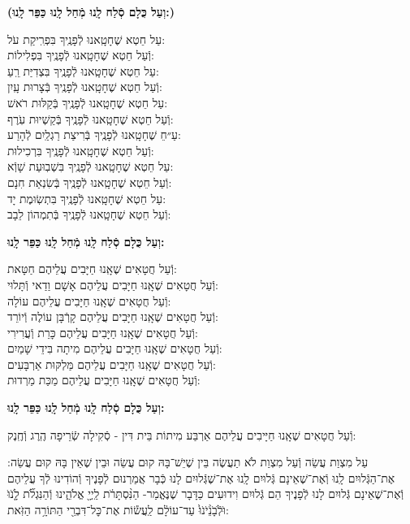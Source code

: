 \documentclass[twoside, openany, parskip=half, 11pt]{book}
\begin{document}
\textbf{(וְעַל כֻּלָם סְֿלַח לָֽנוּ מְֿחַל לָֽנוּ כַּפֵּר לָֽנוּ:)}

עַל חֵטְא שֶׁחָטָֽאנוּ לְֿפָנֶֽיךָ בִּפְרִֽיקַת עֹל:\\ וְֿעַל חֵטְא שֶׁחָטָֽאנוּ לְֿפָנֶֽיךָ בִּפְלִילוֹת: \\
עַל חֵטְא שֶׁחָטָֽאנוּ לְֿפָנֶֽיךָ בִּצְדִיַּת רֵֽעַ: \\ וְֿעַל חֵטְא שֶׁחָטָֽאנוּ לְֿפָנֶֽיךָ בְּֿצָרוּת עָֽיִן: \\
עַל חֵטְא שֶׁחָטָֽאנוּ לְֿפָנֶֽיךָ בְּֿקַלּוּת רֹאשׁ:\\ וְֿעַל חֵטְא שֶׁחָטָֽאנוּ לְֿפָנֶֽיךָ בְּֿקַשְׁיוּת עֹֽרֶף: \\
עַ״חֵ שֶׁחָטָֽאנוּ לְֿפָנֶֽיךָ בְּֿרִיצַת רַגְלַֽיִם לְֿהָרַע:\\ וְֿעַל חֵטְא שֶׁחָטָֽאנוּ לְֿפָנֶֽיךָ בִּרְכִילוּת: \\
עַל חֵטְא שֶׁחָטָֽאנוּ לְֿפָנֶֽיךָ בִּשְׁבֽוּעַת שָׁוְֿא: \\ וְֿעַל חֵטְא שֶׁחָטָֽאנוּ לְֿפָנֶֽיךָ בְּֿשִׂנְאַת חִנָם: \\
עַל חֵטְא שֶׁחָטָֽאנוּ לְֿפָנֶֽיךָ בִּתְשֽׂוּמֶת יָד:\\ וְֿעַל חֵטְא שֶׁחָטָֽאנוּ לְֿפָנֶֽיךָ בְּֿתִמְהוֹן לֵבָב:

\textbf{וְעַל כֻּלָם סְֿלַח לָֽנוּ מְֿחַל לָֽנוּ כַּפֵּר לָֽנוּ:}


וְֿעַל חֲטָאִים שֶׁאָֽנוּ חַיָּבִים עֲלֵיהֶם חַטָּאת:\\
וְֿעַל חֲטָאִים שֶׁאָֽנוּ חַיָּבִים עֲלֵיהֶם אָשָׁם וַדַאי וְֿתָּלוּי:\\
וְֿעַל חֲטָאִים שֶׁאָֽנוּ חַיָּבִים עֲלֵיהֶם עוֹלָה:\\
וְֿעַל חֲטָאִים שֶׁאָֽנוּ חַיָּבִים עֲלֵיהֶם קָרְֿבָּן עוֹלֶה וְֿיוֹרֵד:\\
וְֿעַל חֲטָאִים שֶׁאָֽנוּ חַיָּבִים עֲלֵיהֶם כָּרֵת וְֿעֲרִירִי:\\
וְֿעַל חֲטָאִים שֶׁאָֽנוּ חַיָּבִים עֲלֵיהֶם מִיתָה בִּידֵי שָׁמַיִם:\\
וְֿעַל חֲטָאִים שֶׁאָֽנוּ חַיָּבִים עֲלֵיהֶם מַּלְקּוּת אַרְבָּעִים:\\
וְֿעַל חֲטָאִים שֶׁאָֽנוּ חַיָּבִים עֲלֵיהֶם מַכַּת מַרְדוּת:



\textbf{וְעַל כֻּלָם סְֿלַח לָֽנוּ מְֿחַל לָֽנוּ כַּפֵּר לָֽנוּ:}

וְֿעַל חֲטָאִים שֶׁאָֽנוּ חַיָּיבִים עֲלֵיהֶם אַרְבַּע מִיתוֹת בֵּית דִּין - סְֿקִילָה שְֿׂרֵיפָה הֶֽרֶג וְֿחֶֽנֶק:

עַל מִצְוַת עֲשֵׂה וְֿעַל מִצְוַת לֹא תַעֲשֶׂה בֵּין שֶׁיֵשׁ־בָּהּ קוּם עֲשֵׂה וּבֵין שֶׁאֵין בָּהּ קוּם עֲשֵׂה: אֶת־הַגְּֿלוּיִם לָֽנוּ וְֿאֶת־שֶׁאֵינָם גְּֿלוּיִם לָֽנוּ אֶת־שֶׁגְּֿלוּיִם לָנוּ כְּֿבָר אֲמַרְנוּם לְֿפָנֶיךָ וְֿהוֹדִינוּ לְֿךָ עֲלֵיהֶם וְֿאֶת־שֶׁאֵינָם גְּֿלוּיִם לָנוּ לְֿפָנֶיךָ הֵם גְּֿלוּיִם וִידוּעִים כַּדָּבָר שֶׁנֶּאֱמַר- הַנִּ֨סְתָּרֹ֔ת
לַֽיְיָ֖ אֱלֹהֵ֑ינוּ וְֿהַנִּגְלֹ֞ת לָֹ֤נֹוֹּ וֹּלְֹֿבָֹנֵֹ֨יֹנֹוֹּ֙ עַד־עוֹלָ֔ם לַֽעֲשׂ֕וֹת אֶת־כׇּל־דִּבְרֵ֖י הַתּוֹרָ֥ה הַזֹּֽאת:
\end{document}
